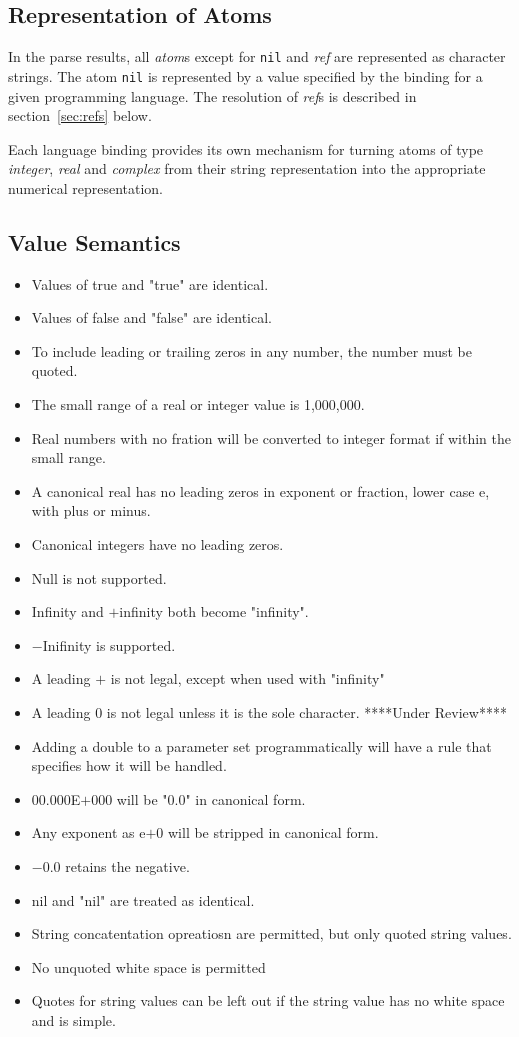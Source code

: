 \documentclass{memarticle}
\begin{document}
	\subsection{Representation of Atoms}
		In the parse results,
		all \emph{atom}s
		except for \texttt{nil} and \emph{ref}
		are represented
		as character strings.
		The atom \texttt{nil} is represented by a 
		value specified by the binding for a given programming language.
		The resolution of \emph{ref}s is described in section~\ref{sec:refs} below.
		\vspace{1mm}
		\par
		Each language binding
		provides its own mechanism
		for turning atoms of type \emph{integer}, \emph{real} and \emph{complex}
		from their string representation
		into the appropriate numerical representation.
	\subsection{Value Semantics}
		\begin{itemize}
			\item Values of true and "true" are identical.
			\item Values of false and "false" are identical.
			\item To include leading or trailing zeros in any number,
					the number must be quoted.
			\item The small range of a real or integer value is 1,000,000.
			\item Real numbers with no fration will be converted to integer format
					if within the small range.
			\item A canonical real has no leading zeros in exponent or fraction, lower case e, with plus or minus.
			\item Canonical integers have no leading zeros.
			\item Null is not supported.
			\item Infinity and $+$infinity both become "infinity".
			\item $-$Inifinity is supported.
			\item A leading $+$ is not legal, except when used with "infinity"
			\item A leading 0 is not legal unless it is the sole character. ****Under Review****
			\item Adding a double to a parameter set programmatically will have a rule that specifies how it will be handled.
			\item 00.000E$+$000 will be "0.0" in canonical form.
			\item Any exponent as e$+$0 will be stripped in canonical form.
			\item $-$0.0 retains the negative.
			\item nil and "nil" are treated as identical.
			\item String concatentation opreatiosn are permitted, but only quoted string values.
			\item No unquoted white space is permitted
			\item Quotes for string values can be left out if the string value has no white space and is simple.
		\end{itemize}
\end{document}
